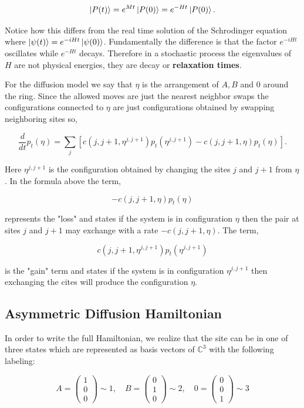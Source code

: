 \documentclass{article}
\begin{document}
\[\ket{P(t)} = e^{Mt}\ket{P(0)} = e^{-Ht}\ket{P(0)}.\]

Notice how this differs from the real time solution of the Schrodinger equation where $\ket{\psi(t)} = e^{-iHt}\ket{\psi(0)}$. Fundamentally the difference is that the factor $e^{-iHt}$ oscillates while $e^{-Ht}$ decays. Therefore in a stochastic process the eigenvalues of $H$ are not physical energies, they are decay or \textbf{relaxation times}. 

For the diffusion model we say that $\eta$ is the arrangement of $A,B$ and $0$ around the ring. Since the allowed moves are just the nearest neighbor swaps the configurations connected to $\eta$ are just configurations obtained by swapping neighboring sites so, 

\[\frac{d}{dt} p_t(\eta) = \sum_j \left[c(j,j+1,\eta^{j,j+1})p_t(\eta^{j,j+1}) - c(j,j+1,\eta)p_t(\eta)\right].\]

Here $\eta^{j,j+1}$ is the configuration obtained by changing the sites $j$ and $j+1$ from $\eta$. In the formula above the term,

\[-c(j,j+1,\eta)p_t(\eta)\]

represents the "loss" and states if the system is in configuration $\eta$ then the pair at sites $j$ and $j+1$ may exchange with a rate $-c(j,j+1,\eta)$. The term,

\[c(j,j+1,\eta^{j,j+1})p_t(\eta^{j,j+1})\]

is the "gain" term and states if the system is in configuration $\eta^{j,j+1}$ then exchanging the cites will produce the configuration $\eta$. 

\subsection{Asymmetric Diffusion Hamiltonian}

In order to write the full Hamiltonian, we realize that the site can be in one of three states which are represented as basis vectors of $\mathbb{C}^3$ with the following labeling: 

\[A = \begin{pmatrix}1 \\ 0 \\ 0\end{pmatrix}\sim 1, \quad B = \begin{pmatrix}0 \\ 1 \\ 0\end{pmatrix}\sim 2,\quad 0 = \begin{pmatrix}0 \\ 0 \\ 1\end{pmatrix}\sim 3\]
\end{document}
